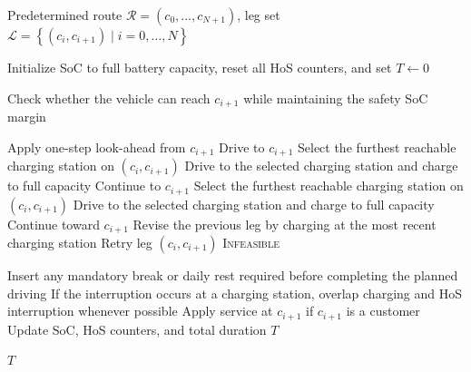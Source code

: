\documentclass[3p,11pt,authoryear]{elsarticle}  %
\begin{document}
\begin{algorithm}[H]
{\color{red}
\caption{Sequential scheduling heuristic}
\label{alg:myopic}
\small
\begin{algorithmic}[1]
\Require Predetermined route $\mathcal{R}=(c_0,\ldots,c_{N+1})$, leg set
$\mathcal{L}=\left\{(c_i,c_{i+1}) \mid i=0,\ldots,N\right\}$ 

\State Initialize SoC to full battery capacity, reset all HoS counters, and set $T\leftarrow 0$


    \State Check whether the vehicle can reach $c_{i+1}$ while maintaining the safety SoC margin

        \State Apply one-step look-ahead from $c_{i+1}$
            \State Drive to $c_{i+1}$
        \Else
            \State Select the furthest reachable charging station on $(c_i,c_{i+1})$
            \State Drive to the selected charging station and charge to full capacity
            \State Continue to $c_{i+1}$
        \EndIf
    \Else
            \State Select the furthest reachable charging station on $(c_i,c_{i+1})$
            \State Drive to the selected charging station and charge to full capacity
            \State Continue toward $c_{i+1}$
            \State Revise the previous leg by charging at the most recent charging station
            \State Retry leg $(c_i,c_{i+1})$
        \Else
            \State \Return \textsc{Infeasible}
        \EndIf
    \EndIf

    \State Insert any mandatory break or daily rest required before completing the planned driving
    \State If the interruption occurs at a charging station, overlap charging and HoS interruption whenever possible
    \State Apply service at $c_{i+1}$ if $c_{i+1}$ is a customer
    \State Update SoC, HoS counters, and total duration $T$

\EndFor

\State \Return $T$
\end{algorithmic}
}
\end{algorithm}
\end{document}
